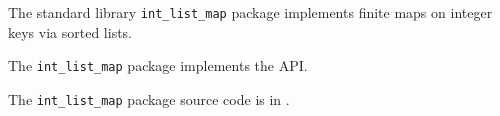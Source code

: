 
The standard library {\tt int\_list\_map} package implements 
finite maps on integer keys via sorted lists.

The {\tt int\_list\_map} package implements the  API.

The {\tt int\_list\_map} package source code is in .




